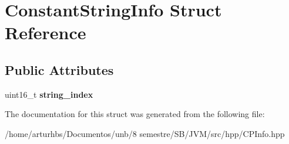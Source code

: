 \hypertarget{structConstantStringInfo}{}\section{Constant\+String\+Info Struct Reference}
\label{structConstantStringInfo}
\subsection*{Public Attributes}
\begin{DoxyCompactItemize}
\item 
uint16\+\_\+t {\bfseries string\+\_\+index}\hypertarget{structConstantStringInfo_af59c7cee9394d4c929ffc4c86e10599b}{}\label{structConstantStringInfo_af59c7cee9394d4c929ffc4c86e10599b}

\end{DoxyCompactItemize}


The documentation for this struct was generated from the following file\+:\begin{DoxyCompactItemize}
\item 
/home/arturhbs/\+Documentos/unb/8 semestre/\+S\+B/\+J\+V\+M/src/hpp/C\+P\+Info.\+hpp\end{DoxyCompactItemize}
